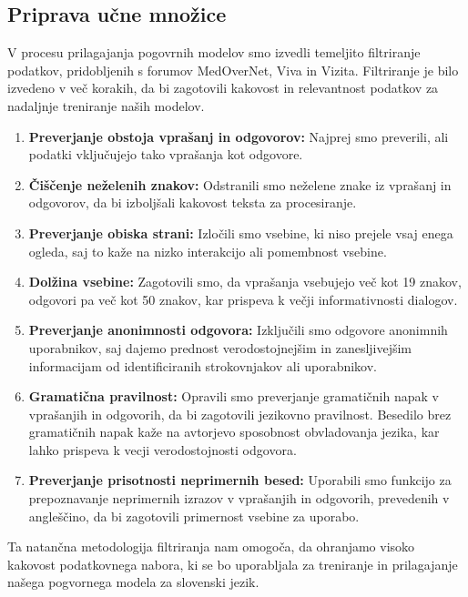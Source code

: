 \documentclass[fleqn,moreauthors,10pt]{ds_report}
\begin{document}
\subsection*{Priprava učne množice}

V procesu prilagajanja pogovrnih modelov smo izvedli temeljito filtriranje podatkov, pridobljenih s forumov MedOverNet, Viva in Vizita. Filtriranje je bilo izvedeno v več korakih, da bi zagotovili kakovost in relevantnost podatkov za nadaljnje treniranje naših modelov.

\begin{enumerate}
    \item \textbf{Preverjanje obstoja vprašanj in odgovorov:} Najprej smo preverili, ali podatki vključujejo tako vprašanja kot odgovore.
    \item \textbf{Čiščenje neželenih znakov:} Odstranili smo neželene znake iz vprašanj in odgovorov, da bi izboljšali kakovost teksta za procesiranje.
    \item \textbf{Preverjanje obiska strani:} Izločili smo vsebine, ki niso prejele vsaj enega ogleda, saj to kaže na nizko interakcijo ali pomembnost vsebine.
    \item \textbf{Dolžina vsebine:} Zagotovili smo, da vprašanja vsebujejo več kot 19 znakov, odgovori pa več kot 50 znakov, kar prispeva k večji informativnosti dialogov.
    \item \textbf{Preverjanje anonimnosti odgovora:} Izključili smo odgovore anonimnih uporabnikov, saj dajemo prednost verodostojnejšim in zanesljivejšim informacijam od identificiranih strokovnjakov ali uporabnikov.
    \item \textbf{Gramatična pravilnost:} Opravili smo preverjanje gramatičnih napak v vprašanjih in odgovorih, da bi zagotovili jezikovno pravilnost. Besedilo brez gramatičnih napak kaže na avtorjevo sposobnost obvladovanja jezika, kar lahko prispeva k vecji verodostojnosti odgovora. 
    \item \textbf{Preverjanje prisotnosti neprimernih besed:} Uporabili smo funkcijo za prepoznavanje neprimernih izrazov v vprašanjih in odgovorih, prevedenih v angleščino, da bi zagotovili primernost vsebine za uporabo.
\end{enumerate}

Ta natančna metodologija filtriranja nam omogoča, da ohranjamo visoko kakovost podatkovnega nabora, ki se bo uporabljala za treniranje in prilagajanje našega pogvornega modela za slovenski jezik.


\end{document}
